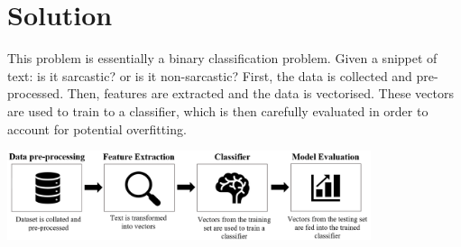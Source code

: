 \documentclass[12pt,a4paper]{article}
\begin{document}








\section{Solution}
This problem is essentially a binary classification problem. Given a snippet of text: is it sarcastic? or is it non-sarcastic? First, the data is collected and pre-processed. Then, features are extracted and the data is vectorised. These vectors are used to train to a classifier, which is then carefully evaluated in order to account for potential overfitting.
\begin{center}
	\includegraphics[width=0.8\textwidth]{Images/modelpipeline2.png}
	\label{Model Pipeline}
\end{center}
\end{document}
